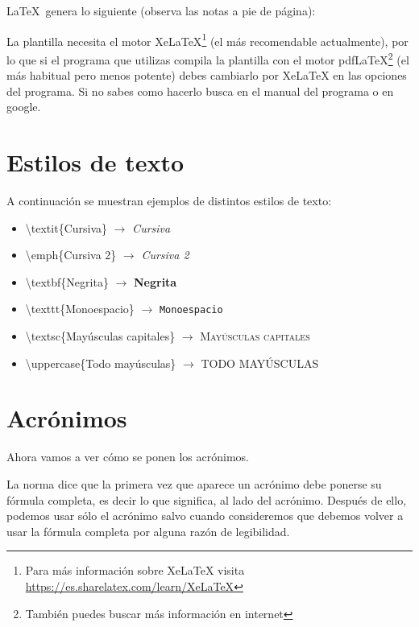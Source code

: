 \LaTeX~genera lo siguiente (observa las notas a pie de página):
\\
\par La plantilla necesita el motor XeLaTeX\footnote{Para más información sobre XeLaTeX visita \url{https://es.sharelatex.com/learn/XeLaTeX}} (el más recomendable actualmente), por lo que si el programa que utilizas compila la plantilla con el motor pdfLaTeX\footnote{También puedes buscar más información en internet} (el más habitual pero menos potente) debes cambiarlo por XeLaTeX en las opciones del programa. Si no sabes como hacerlo busca en el manual del programa o en google.
\section{Estilos de texto}

A continuación se muestran ejemplos de distintos estilos de texto:

\begin{itemize}
	\item \textbackslash textit\{Cursiva\} $\rightarrow$ \textit{Cursiva}
	\item \textbackslash emph\{Cursiva 2\} $\rightarrow$ \emph{Cursiva 2}
	\item \textbackslash textbf\{Negrita\} $\rightarrow$ \textbf{Negrita}
	\item \textbackslash texttt\{Monoespacio\} $\rightarrow$ \texttt{Monoespacio}
	\item \textbackslash textsc\{Mayúsculas capitales\} $\rightarrow$ \textsc{Mayúsculas capitales}
	\item \textbackslash uppercase\{Todo mayúsculas\} $\rightarrow$ \uppercase{Todo mayúsculas} 
\end{itemize}

 \section{Acrónimos}
 Ahora vamos a ver cómo se ponen los acrónimos.
 
 La norma dice que la primera vez que aparece un acrónimo debe ponerse su fórmula completa, es decir lo que significa, al lado del acrónimo. Después de ello, podemos usar sólo el acrónimo salvo cuando consideremos que debemos volver a usar la fórmula completa por alguna razón de legibilidad.
 
